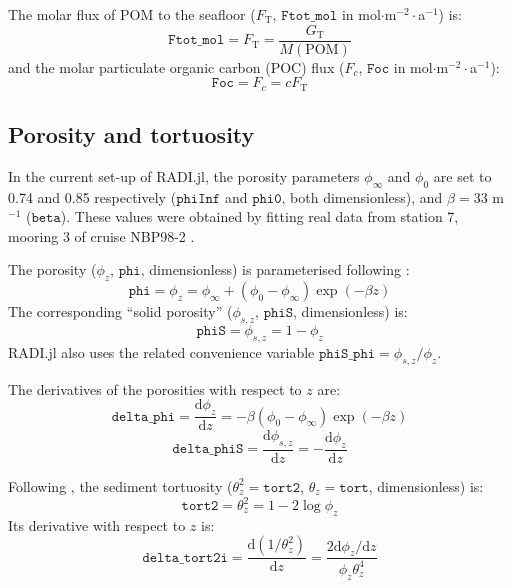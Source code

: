 \documentclass[a4paper]{article}
\newcommand{\D}[1]{\mathrm{d}#1}
\newcommand{\code}[1]{\texttt{#1}}
\begin{document}
The molar flux of POM to the seafloor ($F_\mathrm{T}$, $\code{Ftot\_mol}$ in mol$\cdot$m$^{-2}\cdot$a$^{-1}$) is:
\begin{equation}
\code{Ftot\_mol} = F_\mathrm{T} = \frac{G_\mathrm{T}}{M(\mathrm{POM})}
\end{equation}
and the molar particulate organic carbon (POC) flux ($F_c$, $\code{Foc}$ in mol$\cdot$m$^{-2}\cdot$a$^{-1}$):
\begin{equation}
\code{Foc} = F_c = c F_\mathrm{T}
\end{equation}


\subsection{Porosity and tortuosity}

In the current set-up of RADI.jl, the porosity parameters $\phi_\infty$ and $\phi_0$ are set to 0.74 and 0.85 respectively ($\code{phiInf}$ and $\code{phi0}$, both dimensionless), and $\beta = 33$ m$^{-1}$ ($\code{beta}$).  These values were obtained by fitting real data from station 7, mooring 3 of cruise NBP98-2 \citep{sayles_benthic_2001}.

The porosity ($\phi_z$, $\code{phi}$, dimensionless) is parameterised following \citet{boudreau_method--lines_1996}:
\begin{equation}\label{phi}
\code{phi} = \phi_z = \phi_\infty + (\phi_0 - \phi_\infty) \exp(-\beta z)
\end{equation}
The corresponding ``solid porosity'' ($\phi_{s,z}$, $\code{phiS}$, dimensionless) is:
\begin{equation}\label{phiS}
\code{phiS} = \phi_{s,z} = 1 - \phi_z
\end{equation}
RADI.jl also uses the related convenience variable $\code{phiS\_phi} = \phi_{s,z}/\phi_z$.

The derivatives of the porosities with respect to $z$ are:
\begin{equation}
\code{delta\_phi} = \frac{\D{\phi_z}}{\D{z}} = -\beta (\phi_0 - \phi_\infty) \exp (-\beta z)
\end{equation}
\begin{equation}
\code{delta\_phiS} = \frac{\D{\phi_{s,z}}}{\D{z}} = -\frac{\D{\phi_z}}{\D{z}}
\end{equation}

Following \citet{boudreau_diffusive_1996}, the sediment tortuosity ($\theta_z^2 = \code{tort2}$, $\theta_z = \code{tort}$, dimensionless) is:
\begin{equation}\label{tort}
\code{tort2} = \theta_z^2 = 1 - 2 \log \phi_z
\end{equation}
Its derivative with respect to $z$ is:
\begin{equation}
\code{delta\_tort2i} = \frac{\D{(1 / \theta_z^2)}}{\D{z}} = \frac{2 \D{\phi_z}/\D{z}}{\phi_z \theta_z^4}
\end{equation}
\end{document}
